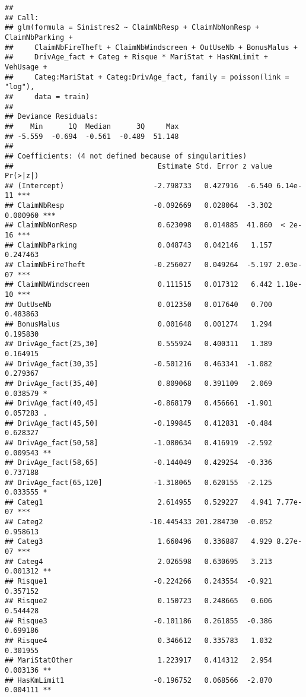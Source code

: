 \documentclass[
]{article}
\begin{document}
\begin{verbatim}
## 
## Call:
## glm(formula = Sinistres2 ~ ClaimNbResp + ClaimNbNonResp + ClaimNbParking + 
##     ClaimNbFireTheft + ClaimNbWindscreen + OutUseNb + BonusMalus + 
##     DrivAge_fact + Categ + Risque * MariStat + HasKmLimit + VehUsage + 
##     Categ:MariStat + Categ:DrivAge_fact, family = poisson(link = "log"), 
##     data = train)
## 
## Deviance Residuals: 
##    Min      1Q  Median      3Q     Max  
## -5.559  -0.694  -0.561  -0.489  51.148  
## 
## Coefficients: (4 not defined because of singularities)
##                                  Estimate Std. Error z value Pr(>|z|)    
## (Intercept)                     -2.798733   0.427916  -6.540 6.14e-11 ***
## ClaimNbResp                     -0.092669   0.028064  -3.302 0.000960 ***
## ClaimNbNonResp                   0.623098   0.014885  41.860  < 2e-16 ***
## ClaimNbParking                   0.048743   0.042146   1.157 0.247463    
## ClaimNbFireTheft                -0.256027   0.049264  -5.197 2.03e-07 ***
## ClaimNbWindscreen                0.111515   0.017312   6.442 1.18e-10 ***
## OutUseNb                         0.012350   0.017640   0.700 0.483863    
## BonusMalus                       0.001648   0.001274   1.294 0.195830    
## DrivAge_fact(25,30]              0.555924   0.400311   1.389 0.164915    
## DrivAge_fact(30,35]             -0.501216   0.463341  -1.082 0.279367    
## DrivAge_fact(35,40]              0.809068   0.391109   2.069 0.038579 *  
## DrivAge_fact(40,45]             -0.868179   0.456661  -1.901 0.057283 .  
## DrivAge_fact(45,50]             -0.199845   0.412831  -0.484 0.628327    
## DrivAge_fact(50,58]             -1.080634   0.416919  -2.592 0.009543 ** 
## DrivAge_fact(58,65]             -0.144049   0.429254  -0.336 0.737188    
## DrivAge_fact(65,120]            -1.318065   0.620155  -2.125 0.033555 *  
## Categ1                           2.614955   0.529227   4.941 7.77e-07 ***
## Categ2                         -10.445433 201.284730  -0.052 0.958613    
## Categ3                           1.660496   0.336887   4.929 8.27e-07 ***
## Categ4                           2.026598   0.630695   3.213 0.001312 ** 
## Risque1                         -0.224266   0.243554  -0.921 0.357152    
## Risque2                          0.150723   0.248665   0.606 0.544428    
## Risque3                         -0.101186   0.261855  -0.386 0.699186    
## Risque4                          0.346612   0.335783   1.032 0.301955    
## MariStatOther                    1.223917   0.414312   2.954 0.003136 ** 
## HasKmLimit1                     -0.196752   0.068566  -2.870 0.004111 ** 

\end{verbatim}
\end{document}
